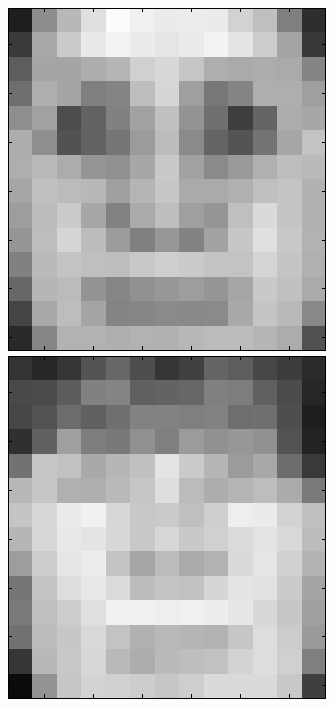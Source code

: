 \begin{figure}[ht]
 \includegraphics[width=\textwidth*11/100]{ch5/figures/XM2VTS_6_1.png}
 \includegraphics[width=\textwidth*11/100]{ch5/figures/XM2VTS_7_1.png}

\end{figure}
